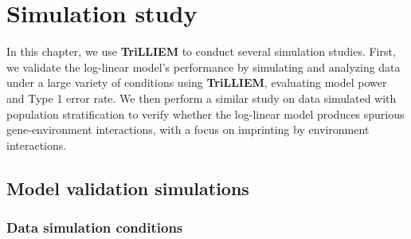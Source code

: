 \chapter{Simulation study}\label{chap:simstudy}

In this chapter, we use \textbf{TriLLIEM} to conduct several simulation studies.
First, we validate the log-linear model's performance by simulating and analyzing data under a large variety of conditions using \textbf{TriLLIEM}, evaluating model power and Type 1 error rate.
We then perform a similar study on data simulated with population stratification to verify whether the log-linear model produces spurious gene-environment interactions, with a focus on imprinting by environment interactions.

\section{Model validation simulations}

\subsection{Data simulation conditions}

